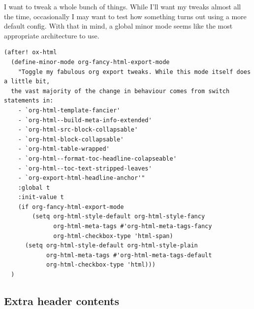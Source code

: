 \documentclass[11pt]{article}
\begin{document}
I want to tweak a whole bunch of things. While I'll want my tweaks almost all
the time, occasionally I may want to test how something turns out using a more
default config. With that in mind, a global minor mode seems like the most
appropriate architecture to use.

\begin{verbatim}
(after! ox-html
  (define-minor-mode org-fancy-html-export-mode
    "Toggle my fabulous org export tweaks. While this mode itself does a little bit,
  the vast majority of the change in behaviour comes from switch statements in:
    - `org-html-template-fancier'
    - `org-html--build-meta-info-extended'
    - `org-html-src-block-collapsable'
    - `org-html-block-collapsable'
    - `org-html-table-wrapped'
    - `org-html--format-toc-headline-colapseable'
    - `org-html--toc-text-stripped-leaves'
    - `org-export-html-headline-anchor'"
    :global t
    :init-value t
    (if org-fancy-html-export-mode
        (setq org-html-style-default org-html-style-fancy
              org-html-meta-tags #'org-html-meta-tags-fancy
              org-html-checkbox-type 'html-span)
      (setq org-html-style-default org-html-style-plain
            org-html-meta-tags #'org-html-meta-tags-default
            org-html-checkbox-type 'html)))
  )
\end{verbatim}
\subsection{Extra header contents}
\label{sec:org85c6736}
\end{document}
